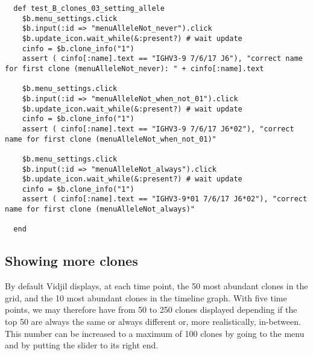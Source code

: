 \begin{verbatim}
  def test_B_clones_03_setting_allele
    $b.menu_settings.click
    $b.input(:id => "menuAlleleNot_never").click
    $b.update_icon.wait_while(&:present?) # wait update
    cinfo = $b.clone_info("1")
    assert ( cinfo[:name].text == "IGHV3-9 7/6/17 J6"), "correct name for first clone (menuAlleleNot_never): " + cinfo[:name].text

    $b.menu_settings.click
    $b.input(:id => "menuAlleleNot_when_not_01").click
    $b.update_icon.wait_while(&:present?) # wait update
    cinfo = $b.clone_info("1")
    assert ( cinfo[:name].text == "IGHV3-9 7/6/17 J6*02"), "correct name for first clone (menuAlleleNot_when_not_01)"

    $b.menu_settings.click
    $b.input(:id => "menuAlleleNot_always").click
    $b.update_icon.wait_while(&:present?) # wait update
    cinfo = $b.clone_info("1")
    assert ( cinfo[:name].text == "IGHV3-9*01 7/6/17 J6*02"), "correct name for first clone (menuAlleleNot_always)"

  end
\end{verbatim}

\subsection{Showing more clones}

By default Vidjil displays, at each time point, the 50 most abundant clones in the grid, and the 10 most abundant clones in the timeline graph.
With five time points, we may therefore have from 50 to 250 clones displayed
depending if the top 50 are always the same or always different or, more
realistically, in-between.
This number can be increased to a maximum of 100 clones by going to the  menu and by putting the
slider to its right end.

